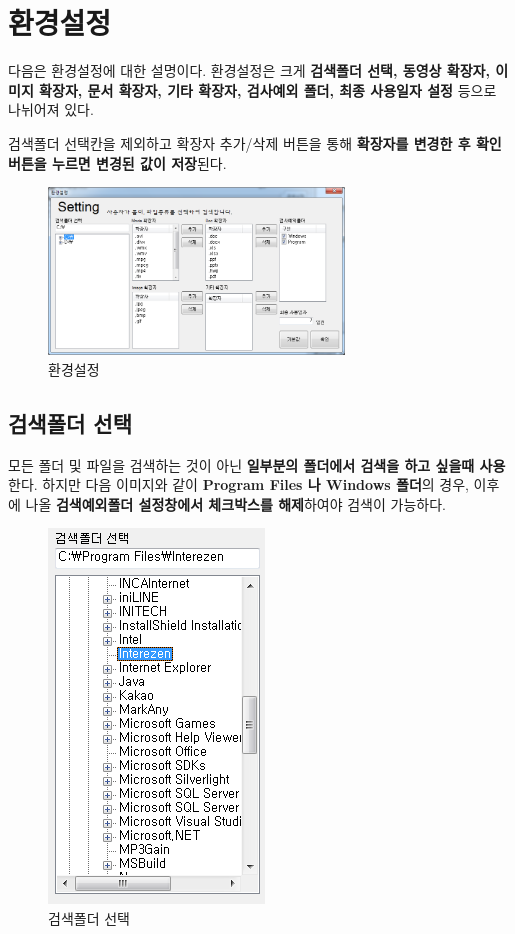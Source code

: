 \documentclass[a4paper, 13pt]{article} %
\begin{document}
	\section{환경설정}
	다음은 환경설정에 대한 설명이다.	환경설정은 크게 \textbf{검색폴더 선택, 동영상 확장자, 이미지 확장자, 문서 확장자, 기타 확장자, 검사예외 폴더, 최종 사용일자 설정} 등으로 나뉘어져 있다.
	
	검색폴더 선택칸을 제외하고 확장자 추가/삭제 버튼을 통해 \textbf{확장자를 변경한 후 확인 버튼을 누르면 변경된 값이 저장}된다.
	
	\begin{figure}[h]
		\centering
		\includegraphics[width=0.7\textwidth]{Figures/Setting}
		\caption{환경설정}
		\label{fig:setting}
	\end{figure}

	\subsection{검색폴더 선택}
	모든 폴더 및 파일을 검색하는 것이 아닌 \textbf{일부분의 폴더에서 검색을 하고 싶을때 사용}한다. 하지만 다음 이미지와 같이 \textbf{Program Files 나 Windows 폴더}의 경우, 이후에 나올 \textbf{검색예외폴더 설정창에서 체크박스를 해제}하여야 검색이 가능하다.
	
	\begin{figure}[h]
		\centering
		\includegraphics[height=0.35\textheight]{Figures/searchfolder}
		\caption{검색폴더 선택}
		\label{fig:searchfolder}
	\end{figure}
	
\end{document}
